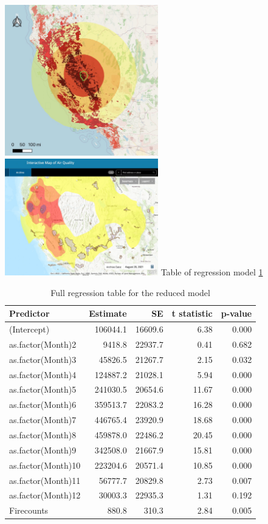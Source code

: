\documentclass[
  12pt,
]{article}
\begin{document}
\includegraphics[width=0.5\textwidth,height=\textheight]{Output/buffer.JPG}
\includegraphics[width=0.5\textwidth,height=\textheight]{Output/AirQualityMap.JPG}
\newline
Table of regression model
\ref{tab:regressionF}

\begin{table}

\caption{\label{tab:regressionF}Full regression table for the reduced model}
\centering
\begin{tabular}[t]{l|r|r|r|r}
\hline
Predictor & Estimate & SE & t statistic & p-value\\
\hline
(Intercept) & 106044.1 & 16609.6 & 6.38 & 0.000\\
\hline
as.factor(Month)2 & 9418.8 & 22937.7 & 0.41 & 0.682\\
\hline
as.factor(Month)3 & 45826.5 & 21267.7 & 2.15 & 0.032\\
\hline
as.factor(Month)4 & 124887.2 & 21028.1 & 5.94 & 0.000\\
\hline
as.factor(Month)5 & 241030.5 & 20654.6 & 11.67 & 0.000\\
\hline
as.factor(Month)6 & 359513.7 & 22083.2 & 16.28 & 0.000\\
\hline
as.factor(Month)7 & 446765.4 & 23920.9 & 18.68 & 0.000\\
\hline
as.factor(Month)8 & 459878.0 & 22486.2 & 20.45 & 0.000\\
\hline
as.factor(Month)9 & 342508.0 & 21667.9 & 15.81 & 0.000\\
\hline
as.factor(Month)10 & 223204.6 & 20571.4 & 10.85 & 0.000\\
\hline
as.factor(Month)11 & 56777.7 & 20829.8 & 2.73 & 0.007\\
\hline
as.factor(Month)12 & 30003.3 & 22935.3 & 1.31 & 0.192\\
\hline
Firecounts & 880.8 & 310.3 & 2.84 & 0.005\\
\hline
\end{tabular}
\end{table}
\end{document}

